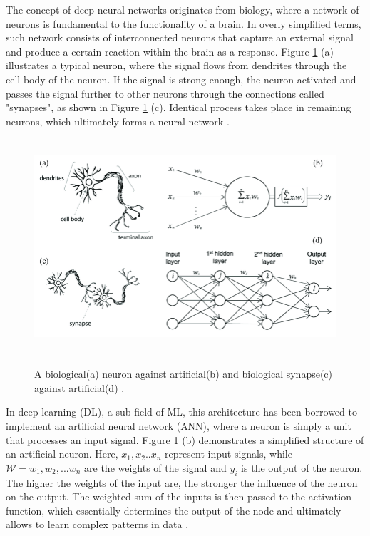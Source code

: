 The concept of deep neural networks originates from biology, where a network of neurons is fundamental to the functionality of a brain. In overly simplified terms, such network consists of interconnected neurons that capture an external signal and produce a certain reaction within the brain as a response. Figure \ref{NeuronSchem} (a) illustrates a typical neuron, where the signal flows from dendrites through the cell-body of the neuron. If the signal is strong enough, the neuron activated and passes the signal further to other neurons through the connections called "synapses", as shown in Figure \ref{NeuronSchem} (c). Identical process takes place in remaining neurons, which ultimately forms a neural network \cite{Mehlig_2021}.

\begin{figure}[htb]
	\begin{center}
		\includegraphics[height=8cm]{./BioNeuronVsArtificial.png}
	\end{center}
	\caption{A biological(a) neuron against artificial(b) and biological synapse(c) against artificial(d) \cite{article1}.}
	\begin{center}
		\label{NeuronSchem}
	\end{center}
\end{figure}

In deep learning (DL), a sub-field of ML, this architecture has been borrowed to implement an artificial neural network (ANN), where a neuron is simply a unit that processes an input signal. Figure \ref{NeuronSchem} (b) demonstrates a simplified structure of an artificial neuron. Here, $x_1, x_2..x_n$ represent input signals, while $\mathcal{W} = w_1, w_2, ... w_n$ are the weights of the signal and $y_i$ is the output of the neuron. The higher the weights of the input are, the stronger the influence of the neuron on the output. The weighted sum of the inputs is then passed to the activation function, which essentially determines the output of the node and ultimately allows to learn complex patterns in data \cite{Mehlig_2021}. 

